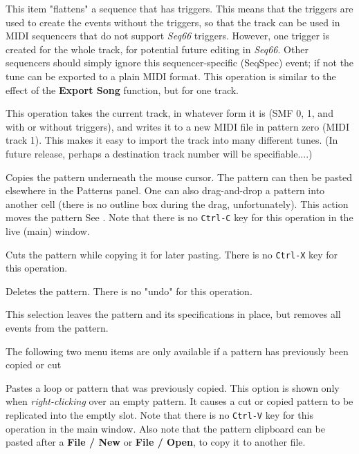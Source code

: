    This item "flattens" a sequence that has triggers.
   This means that the triggers are used to create the events without
   the triggers, so that the track can be used in MIDI sequencers that
   do not support \textsl{Seq66} triggers.
   However, one trigger is created for the whole track, for potential
   future editing in \textsl{Seq66}.
   Other sequencers should simply ignore this sequencer-specific (SeqSpec)
   event; if not the tune can be exported to a plain MIDI format.
   This operation is similar to the effect of the \textbf{Export Song}
   function, but for one track.

   This operation takes the current track, in whatever form it is (SMF 0, 1,
   and with or without triggers), and writes it to a new
   MIDI file in pattern zero (MIDI track 1).
   This makes it easy to import the track into many different tunes.
   (In future release, perhaps a destination track number will be
   specifiable....)

   Copies the pattern underneath the mouse cursor.
   The pattern can then be pasted elsewhere in the Patterns panel.
   One can also drag-and-drop a pattern into another cell (there is no outline
   box during the drag, unfortunately).
   This action moves the pattern
   See .
   Note that there is no \texttt{Ctrl-C} key for this operation in the
   live (main) window.

   Cuts the pattern while copying it for later pasting.
   There is no \texttt{Ctrl-X} key for this operation.

   Deletes the pattern.
   There is no "undo" for this operation.

   This selection leaves the pattern and its specifications in place,
   but removes all events from the pattern.

   The following two menu items are only available if a pattern
   has previously been copied or cut

   Pastes a loop or pattern that was previously copied.
   This option is shown only when
   \textsl{right-clicking} over an empty pattern.
   It causes a cut or copied pattern to be replicated into the emptly slot.
   Note that there is no \texttt{Ctrl-V} key for this operation in the
   main window.
   Also note that the pattern clipboard can be pasted after a
   \textbf{File / New} or \textbf{File / Open},
   to copy it to another file.

